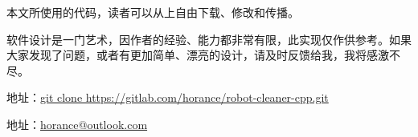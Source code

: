 \begin{content}

本文所使用的代码，读者可以从上自由下载、修改和传播。

软件设计是一门艺术，因作者的经验、能力都非常有限，此实现仅作供参考。如果大家发现了问题，或者有更加简单、漂亮的设计，请及时反馈给我，我将感激不尽。

地址：\href{https://gitlab.com/horance/robot-cleaner-cpp}{git clone https://gitlab.com/horance/robot-cleaner-cpp.git}

地址：\href{mailto:horance@outlook.com}{horance@outlook.com}

\end{content}
